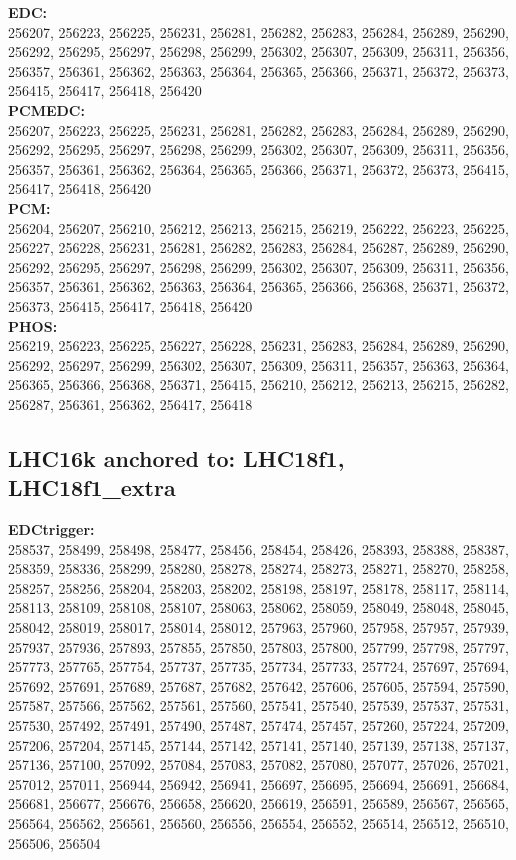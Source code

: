  \textbf{EDC:}\\
256207, 256223, 256225, 256231, 256281, 256282, 256283, 256284, 256289, 256290, 256292, 256295, 256297, 256298, 256299, 256302, 256307, 256309, 256311, 256356, 256357, 256361, 256362, 256363, 256364, 256365, 256366, 256371, 256372, 256373, 256415, 256417, 256418, 256420 \\

 \textbf{PCMEDC:}\\
256207, 256223, 256225, 256231, 256281, 256282, 256283, 256284, 256289, 256290, 256292, 256295, 256297, 256298, 256299, 256302, 256307, 256309, 256311, 256356, 256357, 256361, 256362, 256364, 256365, 256366, 256371, 256372, 256373, 256415, 256417, 256418, 256420\\

 \textbf{PCM:}\\
256204, 256207, 256210, 256212, 256213, 256215, 256219, 256222, 256223, 256225, 256227, 256228, 256231, 256281, 256282, 256283, 256284, 256287, 256289, 256290, 256292, 256295, 256297, 256298, 256299, 256302, 256307, 256309, 256311, 256356, 256357, 256361, 256362, 256363, 256364, 256365, 256366, 256368, 256371, 256372, 256373, 256415, 256417, 256418, 256420\\

 \textbf{PHOS:}\\
256219, 256223, 256225, 256227, 256228, 256231, 256283, 256284, 256289, 256290, 256292, 256297, 256299, 256302, 256307, 256309, 256311, 256357, 256363, 256364, 256365, 256366, 256368, 256371, 256415, 256210, 256212, 256213, 256215, 256282, 256287, 256361, 256362, 256417, 256418\\

 \subsection{LHC16k anchored to: LHC18f1, LHC18f1\_extra}

 \textbf{EDCtrigger:}\\
258537, 258499, 258498, 258477, 258456, 258454, 258426, 258393, 258388, 258387, 258359, 258336, 258299, 258280, 258278, 258274, 258273, 258271, 258270, 258258, 258257, 258256, 258204, 258203, 258202, 258198, 258197, 258178, 258117, 258114, 258113, 258109, 258108, 258107, 258063, 258062, 258059, 258049, 258048, 258045, 258042, 258019, 258017, 258014, 258012, 257963, 257960, 257958, 257957, 257939, 257937, 257936, 257893, 257855, 257850, 257803, 257800, 257799, 257798, 257797, 257773, 257765, 257754, 257737, 257735, 257734, 257733, 257724, 257697, 257694, 257692, 257691, 257689, 257687, 257682, 257642, 257606, 257605, 257594, 257590, 257587, 257566, 257562, 257561, 257560, 257541, 257540, 257539, 257537, 257531, 257530, 257492, 257491, 257490, 257487, 257474, 257457, 257260, 257224, 257209, 257206, 257204, 257145, 257144, 257142, 257141, 257140, 257139, 257138, 257137, 257136, 257100, 257092, 257084, 257083, 257082, 257080, 257077, 257026, 257021, 257012, 257011, 256944, 256942, 256941, 256697, 256695, 256694, 256691, 256684, 256681, 256677, 256676, 256658, 256620, 256619, 256591, 256589, 256567, 256565, 256564, 256562, 256561, 256560, 256556, 256554, 256552, 256514, 256512, 256510, 256506, 256504\\

